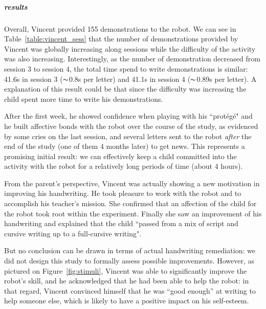 \documentclass[10pt,a4paper]{article}
\begin{document}
\subparagraph{results}
Overall, Vincent provided 155 demonstrations to the robot. We can see in Table~\ref{table:vincent_sess} that the number of demonstrations provided by Vincent was globally increasing along sessions while the difficulty of the activity was also increasing. Interestingly, as the number of demonstration decreased from session 3 to session 4, the total time spend to write demonstrations is similar: 41.6s in session 3 ($\thicksim$0.8s per letter) and 41.1s in session 4 ($\thicksim$0.89s per letter). A explanation of this result could be that since the difficulty was increasing the child spent more time to write his demonstrations.

After the first week, he showed
confidence when playing with his ``prot\'eg\'e" and he built affective bonds with the robot
over the course of the study, as evidenced by some cries on the last session,
and several letters sent to the robot \emph{after} the end of the study
(one of them 4 months later) to get news. This represents a promising initial
result: we can effectively keep a child committed into the activity with the robot for a relatively
long periods of time (about 4 hours).

From the parent's perspective, Vincent was actually showing a new motivation in improving his handwriting. He took pleasure to work with the robot and to accomplish his teacher's mission. She confirmed that an affection of the child for the robot took root within the experiment. Finally she saw an improvement of his handwriting and explained that the child ``passed from a mix of script and cursive writing up to a full-cursive writing".

But no conclusion can be drawn in terms of actual handwriting remediation: we did
not design this study to formally assess possible improvements. However, as pictured on Figure~\ref{fig:stimuli}, Vincent was able to
significantly improve the robot's skill, and he acknowledged that he had been
able to help the robot: in that regard, Vincent convinced himself that he was
``good enough'' at writing to help someone else, which is likely to have
a positive impact on his self-esteem.
\end{document}
